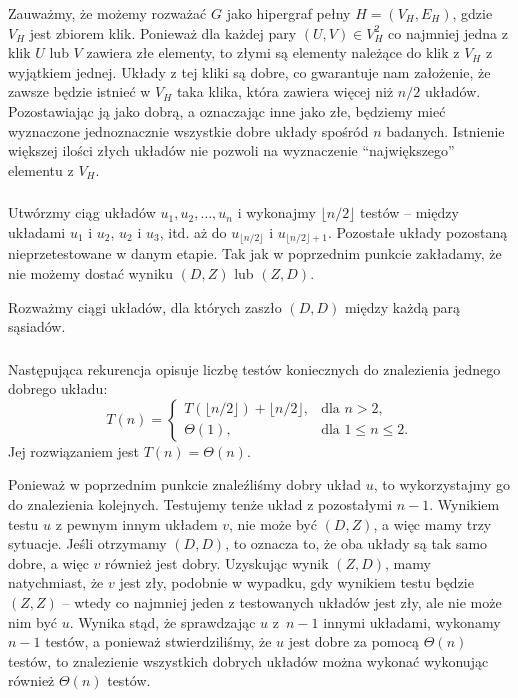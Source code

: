 Zauważmy, że możemy rozważać $G$ jako hipergraf pełny $H=(V_H,E_H)$, gdzie $V_H$ jest zbiorem klik. Ponieważ dla każdej pary $(U,V)\in V_H^2$ co najmniej jedna z klik $U$ lub $V$ zawiera złe elementy, to złymi są elementy należące do klik z $V_H$ z wyjątkiem jednej. Układy z tej kliki są dobre, co gwarantuje nam założenie, że zawsze będzie istnieć w $V_H$ taka klika, która zawiera więcej niż $n/2$ układów. Pozostawiając ją jako dobrą, a oznaczając inne jako złe, będziemy mieć wyznaczone jednoznacznie wszystkie dobre układy spośród $n$ badanych. Istnienie większej ilości złych układów nie pozwoli na wyznaczenie ``największego'' elementu z $V_H$.

\subsubsection{} %
Utwórzmy ciąg układów $u_1,u_2,\dots,u_n$ i wykonajmy $\lfloor n/2\rfloor$ testów -- między układami $u_1$ i $u_2$, $u_2$ i $u_3$, itd. aż do $u_{\lfloor n/2\rfloor}$ i $u_{\lfloor n/2\rfloor+1}$. Pozostałe układy pozostaną nieprzetestowane w danym etapie. Tak jak w poprzednim punkcie zakładamy, że nie możemy dostać wyniku $(D,Z)$ lub $(Z,D)$.

Rozważmy ciągi układów, dla których zaszło $(D,D)$ między każdą parą sąsiadów. 

\subsubsection{} %
Następująca rekurencja opisuje liczbę testów koniecznych do znalezienia jednego dobrego układu:
\[
	T(n) =
	\begin{cases}
		T(\lfloor n/2\rfloor) + \lfloor n/2\rfloor, & \text{dla $n>2$}, \\
		\Theta(1), & \text{dla $1\le n\le2$}.
	\end{cases}
\]
Jej rozwiązaniem jest $T(n)=\Theta(n)$.

Ponieważ w poprzednim punkcie znaleźliśmy dobry układ $u$, to wykorzystajmy go do znalezienia kolejnych. Testujemy tenże układ z pozostałymi $n-1$. Wynikiem testu $u$ z pewnym innym układem $v$, nie może być $(D,Z)$, a więc mamy trzy sytuacje. Jeśli otrzymamy $(D,D)$, to oznacza to, że oba układy są tak samo dobre, a więc $v$ również jest dobry. Uzyskując wynik $(Z,D)$, mamy natychmiast, że $v$ jest zły, podobnie w wypadku, gdy wynikiem testu będzie $(Z,Z)$ -- wtedy co najmniej jeden z testowanych układów jest zły, ale nie może nim być $u$. Wynika stąd, że sprawdzając $u$ z~$n-1$ innymi układami, wykonamy $n-1$ testów, a ponieważ stwierdziliśmy, że $u$ jest dobre za pomocą $\Theta(n)$ testów, to znalezienie wszystkich dobrych układów można wykonać wykonując również $\Theta(n)$ testów.

